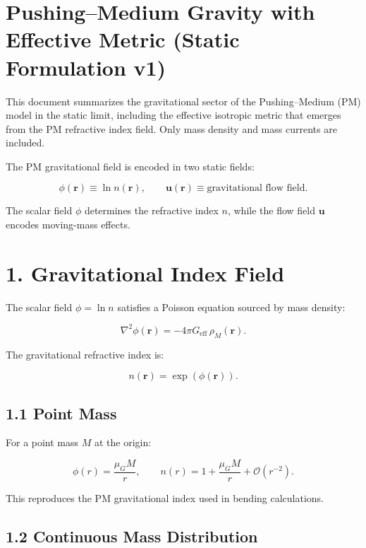 \documentclass{article}
\begin{document}
\section*{Pushing--Medium Gravity with Effective Metric (Static Formulation v1)}

This document summarizes the gravitational sector of the Pushing--Medium (PM)
model in the static limit, including the effective isotropic metric that
emerges from the PM refractive index field. Only mass density and mass currents
are included.

The PM gravitational field is encoded in two static fields:



\[
\phi(\mathbf r) \equiv \ln n(\mathbf r),
\qquad
\mathbf u(\mathbf r) \equiv \text{gravitational flow field}.
\]



The scalar field $\phi$ determines the refractive index $n$, while the flow
field $\mathbf u$ encodes moving-mass effects.

\section*{1. Gravitational Index Field}

The scalar field $\phi = \ln n$ satisfies a Poisson equation sourced by mass
density:



\[
\nabla^2 \phi(\mathbf r)
=
-4\pi G_{\mathrm{eff}}\,\rho_M(\mathbf r).
\]



The gravitational refractive index is:



\[
n(\mathbf r) = \exp(\phi(\mathbf r)).
\]



\subsection*{1.1 Point Mass}

For a point mass $M$ at the origin:



\[
\phi(r) = \frac{\mu_G M}{r},
\qquad
n(r) = 1 + \frac{\mu_G M}{r} + \mathcal{O}(r^{-2}).
\]



This reproduces the PM gravitational index used in bending calculations.

\subsection*{1.2 Continuous Mass Distribution}
\end{document}
